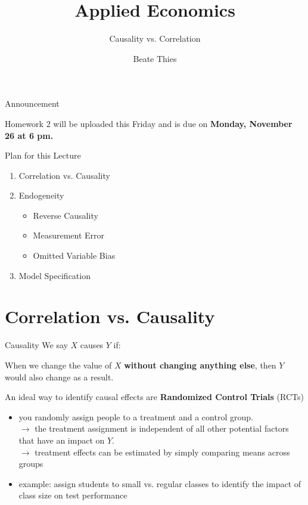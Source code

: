 \documentclass[11pt, aspectratio = 169]{beamer}
\title{Applied Economics}
\subtitle{Causality vs. Correlation}
\author{Beate Thies}
\date{}
\institute{Winter 2024/25}
\begin{document}


\maketitle

\begin{frame}{Announcement}

Homework 2 will be uploaded this Friday and is due on \textbf{Monday, November 26 at 6 pm.} 
\end{frame}

\begin{frame}{Plan for this Lecture}
\begin{enumerate}

\item Correlation vs. Causality
\item Endogeneity
\begin{itemize}
    \item Reverse Causality
    \item Measurement Error
    \item Omitted Variable Bias
\end{itemize}
\item Model Specification

\end{enumerate}
\end{frame}

\section{Correlation vs. Causality}
\begin{frame}{Causality}
We say $X$ \alert{causes} $Y$ if: 

When we change the value of $X$ \textbf{without changing anything else}, then $Y$ would also change as a result.

\bigskip
An ideal way to identify causal effects are \color{teal}\textbf{Randomized Control Trials} (RCTs)

\begin{itemize}
    \item you randomly assign people to a treatment and a control group. \\
  $\rightarrow$ the treatment assignment is independent of all other potential factors that \hspace*{+0.32cm} have an impact on $Y$. \\
$\rightarrow$ treatment effects can be estimated by simply comparing means across groups
\item example: assign students to small vs. regular classes to identify the impact of class size on test performance
\end{itemize}
\end{frame}
\end{document}
